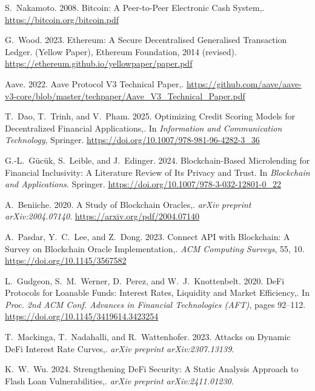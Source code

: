{\begin{enumerate}[label={[\arabic*]}]
\item S.~Nakamoto. 2008. Bitcoin: A Peer-to-Peer Electronic Cash System,. \url{https://bitcoin.org/bitcoin.pdf}

\item G.~Wood. 2023. Ethereum: A Secure Decentralised Generalised Transaction Ledger. (Yellow Paper), Ethereum Foundation, 2014 (revised). \url{https://ethereum.github.io/yellowpaper/paper.pdf}

\item Aave. 2022. Aave Protocol V3 Technical Paper,. \url{https://github.com/aave/aave-v3-core/blob/master/techpaper/Aave_V3_Technical_Paper.pdf}

\item T.~Dao, T.~Trinh, and V.~Pham. 2025. Optimizing Credit Scoring Models for Decentralized Financial Applications,. In \emph{Information and Communication Technology}, Springer. \url{https://doi.org/10.1007/978-981-96-4282-3_36}

\item G.-L.~G\"{u}c\"{u}k, S.~Leible, and J.~Edinger. 2024. Blockchain-Based Microlending for Financial Inclusivity: A Literature Review of Its Privacy and Trust. In \emph{Blockchain and Applications}. Springer. \url{https://doi.org/10.1007/978-3-032-12801-0_22}

\item A.~Beniiche. 2020. A Study of Blockchain Oracles,. \emph{arXiv preprint arXiv:2004.07140}. \url{https://arxiv.org/pdf/2004.07140}

\item A.~Pasdar, Y.~C.~Lee, and Z.~Dong. 2023. Connect API with Blockchain: A Survey on Blockchain Oracle Implementation,. \emph{ACM Computing Surveys}, 55, 10. \url{https://doi.org/10.1145/3567582}

\item L.~Gudgeon, S.~M.~Werner, D.~Perez, and W.~J.~Knottenbelt. 2020. DeFi Protocols for Loanable Funds: Interest Rates, Liquidity and Market Efficiency,. In \emph{Proc. 2nd ACM Conf. Advances in Financial Technologies (AFT)}, pages 92--112. \url{https://doi.org/10.1145/3419614.3423254}

\item T.~Mackinga, T.~Nadahalli, and R.~Wattenhofer. 2023. Attacks on Dynamic DeFi Interest Rate Curves,. \emph{arXiv preprint arXiv:2307.13139}.

\item K.~W.~Wu. 2024. Strengthening DeFi Security: A Static Analysis Approach to Flash Loan Vulnerabilities,. \emph{arXiv preprint arXiv:2411.01230}.


\end{enumerate}}
